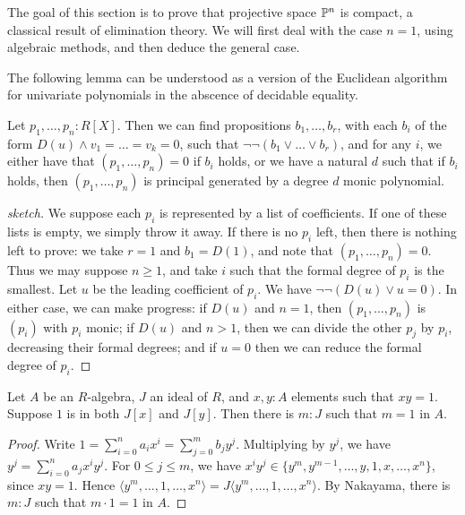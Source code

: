 The goal of this section is to prove that projective space $\mathbb{P}^n$ is compact,
a classical result of elimination theory.
We will first deal with the case $n = 1$, using algebraic methods, and
then deduce the general case.

The following lemma can be understood as a version of the Euclidean algorithm
for univariate polynomials in the abscence of decidable equality.
\begin{proposition}\label{euclid}
  Let $p_1, \ldots, p_n : R[X]$. Then we can find propositions
  $b_1,\ldots,b_r$, with each $b_i$ of the form $D(u) \wedge v_1 = \ldots = v_k = 0$,
  such that $\neg \neg (b_1 \vee \ldots \vee b_r)$,
  and for any $i$, we either have that $(p_1,\ldots,p_n) = 0$ if $b_i$ holds,
  or we have a natural $d$ such that if $b_i$ holds,
  then $(p_1,\ldots,p_n)$ is principal generated by a degree $d$ monic polynomial.
\end{proposition}
\begin{proof}[sketch]
  We suppose each $p_i$ is represented by a list of coefficients.
  If one of these lists is empty, we simply throw it away.
  If there is no $p_i$ left,
  then there is nothing left to prove: we take $r = 1$ and $b_1 = D(1)$,
  and note that $(p_1,\ldots,p_n) = 0$.
  Thus we may suppose $n \ge 1$, and take $i$ such that the formal degree
  of $p_i$ is the smallest. Let $u$ be the leading coefficient of $p_i$.
  We have $\neg \neg (D(u) \vee u = 0)$. 
  In either case, we can make progress: if $D(u)$ and $n = 1$,
  then $(p_1,\ldots,p_n)$ is $(p_i)$ with $p_i$ monic;
  if $D(u)$ and $n > 1$, then we can divide the other $p_j$ by $p_i$,
  decreasing their formal degrees;
  and if $u = 0$ then we can reduce the formal degree of $p_i$.
\end{proof}

\begin{lemma}\label{lorenzen}
  Let $A$ be an $R$-algebra, $J$ an ideal of $R$, and $x, y : A$ elements
  such that $xy = 1$. Suppose $1$ is in both $J[x]$ and $J[y]$.
  Then there is $m : J$  such that $m = 1$ in $A$.
\end{lemma}
\begin{proof}
  Write $1 = \sum_{i=0}^n a_ix^i = \sum_{j=0}^m b_j y^j$.
  Multiplying by $y^j$, we have
  $y^j = \sum_{i=0}^n a_j x^i y^j$.
  For $0 \le j \le m$, we have
  $x^i y^j \in \{y^m,y^{m-1},\ldots,y,1,x,\ldots,x^n\}$, since $xy = 1$.
  Hence $\langle y^m,\ldots,1,\ldots,x^n \rangle = J\langle y^m,\ldots,1,\ldots,x^n\rangle$.
  By Nakayama, there is $m : J$ such that $m \cdot 1 = 1$ in $A$.
\end{proof}

